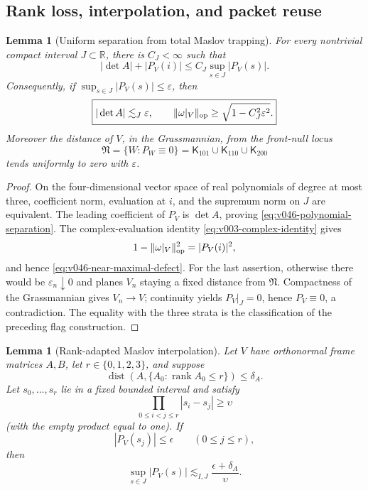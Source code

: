 \documentclass[10pt]{article}
\newtheorem{lemma}[theorem]{Lemma}
\newcommand{\R}{\mathbb R}
\newcommand{\rank}{\operatorname{rank}}
\begin{document}
\subsection{Rank loss, interpolation, and packet reuse}

\begin{lemma}[Uniform separation from total Maslov trapping]
\label{lem:v046-polynomial-separation}
For every nontrivial compact interval \(J\subset\R\), there is \(C_J<\infty\) such that
\begin{equation}
\label{eq:v046-polynomial-separation}
\boxed{
|\det A|+|P_V(i)|
\le
C_J\sup_{s\in J}|P_V(s)|.
}
\end{equation}
Consequently, if
\(\sup_{s\in J}|P_V(s)|\le\varepsilon\), then
\begin{equation}
\label{eq:v046-near-maximal-defect}
\boxed{
|\det A|\lesssim_J\varepsilon,
\qquad
\|\omega|_V\|_{\rm op}
\ge
\sqrt{1-C_J^2\varepsilon^2}.
}
\end{equation}
Moreover the distance of \(V\), in the Grassmannian, from the front-null locus
\[
\mathfrak N
=
\{W:P_W\equiv0\}
=
\mathsf K_{101}\cup\mathsf K_{110}\cup\mathsf K_{200}
\]
tends uniformly to zero with \(\varepsilon\).
\end{lemma}

\begin{proof}
On the four-dimensional vector space of real polynomials of degree at most three, coefficient norm,
evaluation at \(i\), and the supremum norm on \(J\) are equivalent.  The leading coefficient of
\(P_V\) is \(\det A\), proving \eqref{eq:v046-polynomial-separation}.  The complex-evaluation
identity \eqref{eq:v003-complex-identity} gives
\[
1-\|\omega|_V\|_{\rm op}^2=|P_V(i)|^2,
\]
and hence \eqref{eq:v046-near-maximal-defect}.  For the last assertion, otherwise there would be
\(\varepsilon_n\downarrow0\) and planes \(V_n\) staying a fixed distance from \(\mathfrak N\).
Compactness of the Grassmannian gives \(V_n\to V\); continuity yields
\(P_V|_J=0\), hence \(P_V\equiv0\), a contradiction.  The equality with the three strata is the
classification of the preceding flag construction.
\end{proof}

\begin{lemma}[Rank-adapted Maslov interpolation]
\label{lem:v046-rank-adapted-interpolation}
Let \(V\) have orthonormal frame matrices \(A,B\), let \(r\in\{0,1,2,3\}\), and suppose
\[
\operatorname{dist}\!\left(A,\{A_0:\rank A_0\le r\}\right)
\le\delta_A.
\]
Let \(s_0,\ldots,s_r\) lie in a fixed bounded interval and satisfy
\[
\prod_{0\le i<j\le r}|s_i-s_j|\ge\upsilon
\]
(with the empty product equal to one).  If
\[
|P_V(s_j)|\le\epsilon
\qquad(0\le j\le r),
\]
then
\begin{equation}
\label{eq:v046-rank-adapted-interpolation}
\boxed{
\sup_{s\in J}|P_V(s)|
\lesssim_{I,J}
\frac{\epsilon+\delta_A}{\upsilon}.
}
\end{equation}
\end{lemma}
\end{document}
